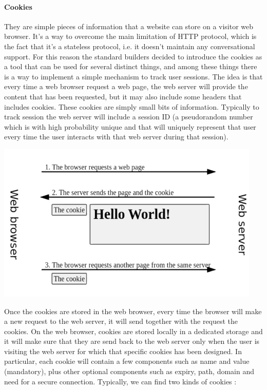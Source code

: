 \paragraph{Cookies} They are simple pieces of information that a website can store on a visitor web browser. It's a way to overcome the main limitation of HTTP protocol, which is the fact that it's a stateless protocol, i.e. it doesn't maintain any conversational support. For this reason the standard builders decided to introduce the cookies as a tool that can be used for several distinct things, and among these things there is a way to implement a simple mechanism to track user sessions. The idea is that every time a web browser request a web page, the web server will provide the content that has been requested, but it may also include some headers that includes cookies. These cookies are simply small bits of information. Typically to track session the web server will include a session ID (a pseudorandom number which is with high probability unique and that will uniquely represent that user every time the user interacts with that web server during that session).
\begin{center}
\includegraphics[scale=0.5]{./images/cookies_schema.png}
\end{center}
Once the cookies are stored in the web browser, every time the browser will make a new request to the web server, it will send together with the request the cookies. On the web browser, cookies are stored locally in a dedicated storage and it will make sure that they are send back to the web server only when the user is visiting the web server for which that specific cookies has been designed. In particular, each cookie will contain a few components such as name and value (mandatory), plus other optional components such as expiry, path, domain and need for a secure connection. Typically, we can find two kinds of cookies :
